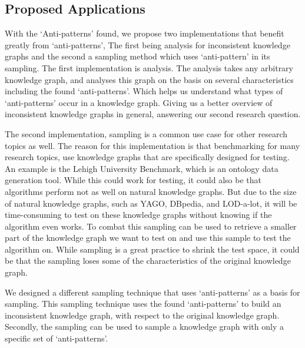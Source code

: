 \documentclass[11pt,letterpaper ,oneside ]{book}
\begin{document}
	\subsection{Proposed Applications}
	With the `Anti-patterns' found, we propose two implementations that benefit greatly from `anti-patterns', The first being analysis for inconsistent knowledge graphs and the second a sampling method which uses `anti-pattern' in its sampling. The first implementation is analysis. The analysis takes any arbitrary knowledge graph, and analyses this graph on the basis on several characteristics including the found `anti-patterns'. Which helps us understand what types of `anti-patterns' occur in a knowledge graph. Giving us a better overview of inconsistent knowledge graphs in general, answering our second research question.
	
	The second implementation, sampling is a common use case for other research topics as well. The reason for this implementation is that benchmarking for many research topics, use knowledge graphs that are specifically designed for testing. An example is the Lehigh University Benchmark, which is an ontology data generation tool. While this could work for testing, it could also be that algorithms perform not as well on natural knowledge graphs. But due to the size of natural knowledge graphs, such as YAGO, DBpedia, and LOD-a-lot, it will be time-consuming to test on these knowledge graphs without knowing if the algorithm even works. To combat this sampling can be used to retrieve a smaller part of the knowledge graph we want to test on and use this sample to test the algorithm on. While sampling is a great practice to shrink the test space, it could be that the sampling loses some of the characteristics of the original knowledge graph. 
	
	We designed a different sampling technique that uses `anti-patterns' as a basis for sampling. This sampling technique uses the found `anti-patterns' to build an inconsistent knowledge graph, with respect to the original knowledge graph. Secondly, the sampling can be used to sample a knowledge graph with only a specific set of `anti-patterns'.
	
\end{document}
